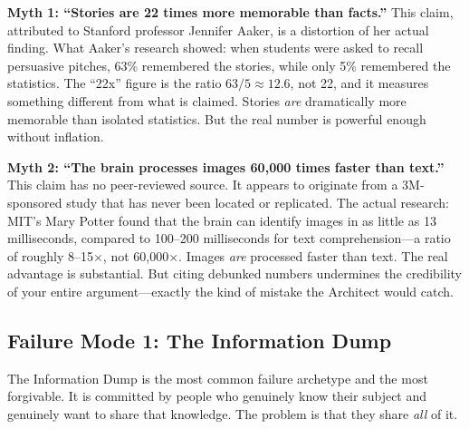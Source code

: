\textbf{Myth 1: ``Stories are 22 times more memorable than facts.''} This claim, attributed to Stanford professor Jennifer Aaker, is a distortion of her actual finding. What Aaker's research showed: when students were asked to recall persuasive pitches, 63\% remembered the stories, while only 5\% remembered the statistics. The ``22x'' figure is the ratio $63/5 \approx 12.6$, not 22, and it measures something different from what is claimed. Stories \emph{are} dramatically more memorable than isolated statistics. But the real number is powerful enough without inflation.

\textbf{Myth 2: ``The brain processes images 60,000 times faster than text.''} This claim has no peer-reviewed source. It appears to originate from a 3M-sponsored study that has never been located or replicated. The actual research: MIT's Mary Potter found that the brain can identify images in as little as 13 milliseconds, compared to 100--200 milliseconds for text comprehension---a ratio of roughly 8--15$\times$, not 60,000$\times$. Images \emph{are} processed faster than text. The real advantage is substantial. But citing debunked numbers undermines the credibility of your entire argument---exactly the kind of mistake the Architect would catch.

\subsection{Failure Mode 1: The Information Dump}

The Information Dump is the most common failure archetype and the most forgivable. It is committed by people who genuinely know their subject and genuinely want to share that knowledge. The problem is that they share \emph{all} of it.

